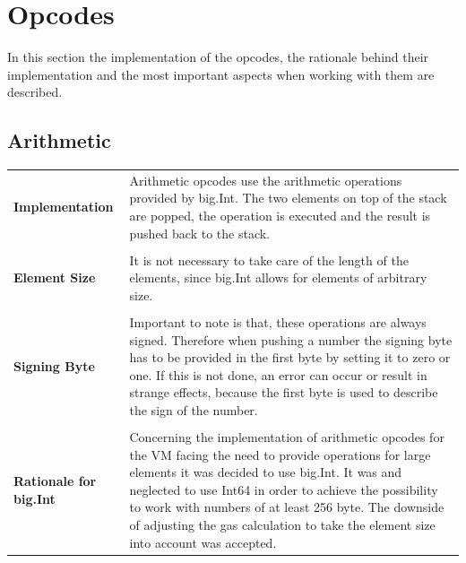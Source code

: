 \section{Opcodes}
In this section the implementation of the opcodes, the rationale behind their implementation and the most important aspects when working with them are described.
\subsection{Arithmetic}
\label{arithmetic}
\begin{tabular}[t]{ p{3cm} p{12.5cm}}
\raggedright
\textbf{Implementation} &
Arithmetic opcodes use the arithmetic operations provided by big.Int. The two elements on top of the stack are popped, the operation is executed and the result is pushed back to the stack. \\ \\

\raggedright
\textbf{Element Size} &
It is not necessary to take care of the length of the elements, since big.Int allows for elements of arbitrary size. \\ \\

\raggedright
\textbf{Signing Byte} &
Important to note is that, these operations are always signed. Therefore when pushing a number the signing byte has to be provided in the first byte by setting it to zero or one. If this is not done, an error can occur or result in strange effects, because the first byte is used to describe the sign of the number. \\ \\

\raggedright
\textbf{Rationale for big.Int} &
Concerning the implementation of arithmetic opcodes for the VM
facing the need to provide operations for large elements it was decided to use big.Int. It was and neglected to use Int64 in order to achieve the possibility to work with numbers of at least 256 byte. The downside of adjusting the gas calculation to take the element size into account was accepted. \\
\end{tabular}

